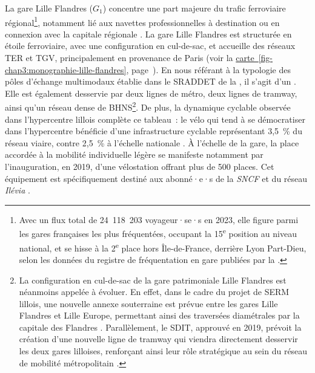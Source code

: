 \begin{refsegment}
La gare Lille Flandres (\(G_1\)) concentre une part majeure du trafic ferroviaire régional\footnote{
    Avec un flux total de 24~118~203 voyageur·se·s en 2023, elle figure parmi les gares françaises les plus fréquentées, occupant la 15\textsuperscript{e} position au niveau national, et se hisse à la 2\textsuperscript{e} place hors Île-de-France, derrière Lyon Part-Dieu, selon les données du registre de fréquentation en gare publiées par la \textcolor{blue}{\textcite{sncf_frequentation_2024}}.
}, notamment lié aux navettes professionnelles à destination ou en connexion avec la capitale régionale \textcolor{blue}{\autocite[12]{hasiak_estimation_2018}}. La gare Lille Flandres est structurée en étoile ferroviaire, avec une configuration en cul-de-sac, et accueille des réseaux \acrshort{TER} et \acrshort{TGV}, principalement en provenance de Paris (voir la \hyperref[fig-chap3:monographie-lille-flandres]{carte~\ref{fig-chap3:monographie-lille-flandres}}, page~\pageref{fig-chap3:monographie-lille-flandres}). En nous référant à la typologie des pôles d'échange multimodaux établie dans le \acrshort{SRADDET} de la \textcolor{blue}{\textcite[81]{region_hauts-de-france_sraddet_2024}}, il s'agit d'un . Elle est également desservie par deux lignes de métro, deux lignes de tramway, ainsi qu'un réseau dense de \acrshort{BHNS}\footnote{
    La configuration en cul-de-sac de la gare patrimoniale Lille Flandres est néanmoins appelée à évoluer. En effet, dans le cadre du projet de \acrfull{SERM} lillois, une nouvelle annexe souterraine est prévue entre les gares Lille Flandres et Lille Europe, permettant ainsi des traversées diamétrales par la capitale des Flandres \textcolor{blue}{\textcite{metropole_europeenne_de_lille_construisons_nodate}}. Parallèlement, le \acrfull{SDIT}, approuvé en 2019, prévoit la création d'une nouvelle ligne de tramway qui viendra directement desservir les deux gares lilloises, renforçant ainsi leur rôle stratégique au sein du réseau de mobilité métropolitain \textcolor{blue}{\textcite{metropole_europeenne_de_lille_service_2023}}.
}. De plus, la dynamique cyclable observée dans l’hypercentre lillois complète ce tableau~: le vélo qui tend à se démocratiser dans l'hypercentre bénéficie d’une infrastructure cyclable représentant 3,5~\% du réseau viaire, contre 2,5~\% à l’échelle nationale \textcolor{blue}{\autocite[103]{cordier_parts_2021}}. À l’échelle de la gare, la place accordée à la mobilité individuelle légère se manifeste notamment par l’inauguration, en 2019, d’une vélostation offrant plus de 500 places. Cet équipement est spécifiquement destiné aux abonné·e·s de la \textsl{SNCF} et du réseau \textsl{Ilévia} \textcolor{blue}{\autocite[]{adav_velostation_nodate}}.%


\end{refsegment}
